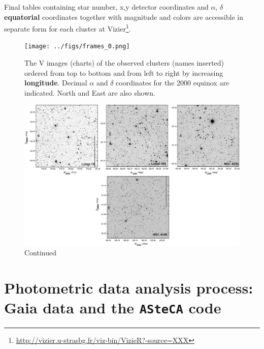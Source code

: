 \documentclass[referee]{aa}
\begin{document}
Final tables containing star number, x,y detector coordinates and $\alpha$,
$\delta$ \textbf{equatorial} coordinates together with magnitude and colors are
accessible in separate form for each cluster at
Vizier\footnote{\url{http://vizier.u-strasbg.fr/viz-bin/VizieR?-source=XXX}}.

\begin{figure}[htp]
    \centering
     \texttt{[image: ../figs/frames\_0.png]}   
\caption{The V images (charts) of the observed clusters (names inserted)
ordered from top to bottom and from left to right by increasing 
\textbf{longitude}.
Decimal $\alpha$ and $\delta$ coordinates for the 2000 equinox are
indicated. North and East are also shown.}
    \label{fig:Vim}
\end{figure}

\begin{figure}[htp]
    \addtocounter{figure}{-1}
    \centering
    \includegraphics[width=1\hsize]{../figs/frames_1.png}
    \caption{Continued}
    \label{fig:Vim2}
\end{figure}





\section{Photometric data analysis process: Gaia data and the \texttt{ASteCA}
code}
\label{sec:photom_analysis}
\end{document}
